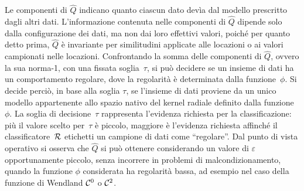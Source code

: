 Le componenti di $\widehat Q$ indicano quanto ciascun dato devìa dal modello prescritto dagli altri dati.  L’informazione contenuta nelle componenti di $\widehat Q$  dipende solo dalla configurazione dei dati, ma non dai loro effettivi valori, poiché per quanto detto prima, $\widehat Q$ è invariante per similitudini applicate alle locazioni o ai valori campionati nelle locazioni.
Confrontando la somma delle componenti di $\widehat Q$, ovvero la sua norma-1, con una fissata soglia~$\tau$, si può decidere se un insieme di dati ha un comportamento regolare, dove la regolarità è determinata dalla funzione~$\phi$.  Si decide perciò, in base alla soglia $\tau$, se l’insieme di dati proviene da un unico modello appartenente allo spazio nativo del kernel radiale definito dalla funzione~$\phi$. 
 La soglia di decisione~$\tau$ rappresenta l’evidenza richiesta per la classificazione:  più il valore scelto per~$\tau$ è piccolo, maggiore è l’evidenza richiesta affinché il classificatore~$\cal R$ etichetti un campione di dati come “regolare”.
Dal punto di vista operativo si osserva che $\widehat Q$ si può ottenere considerando un valore di $\varepsilon$ opportunamente piccolo, senza incorrere in problemi di malcondizionamento, quando la funzione $\phi$ considerata ha regolarità bassa, ad esempio nel caso della funzione di Wendland ${\cal C}^0$ o ${\cal C}^2$.










